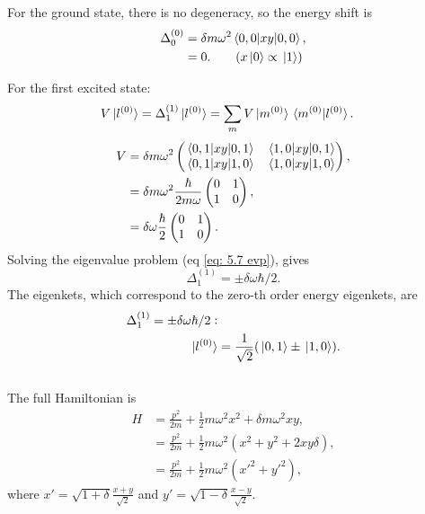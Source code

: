 \documentclass[
a4paper,
10pt,
twoside,
]{article}
\begin{document}
\subsection{}\label{ssec: IIb}

For the ground state, there is no degeneracy, so the energy shift is
\begin{align}
	\Delta_0^{(0)} &= \delta m \omega^2 \mel*{0,0}{xy}{0,0},\\
	&= 0. \qquad (x\ket*{0}\propto \ket*{1})
\end{align}

For the first excited state:
\begin{align}
	V\ket*{l^{(0)}} = \Delta_1^{(1)}\ket*{l^{(0)}} &= \sum_{m} V\ket*{m^{(0)}}\ip*{m^{(0)}}{l^{(0)}}.
	\label{eq: 5.7 evp}
\end{align}
\begin{align}
	V &= \delta m \omega^2\begin{pmatrix}
		\mel*{0,1}{xy}{0,1} & \mel*{1,0}{xy}{0,1}\\
		\mel*{0,1}{xy}{1,0} & \mel*{1,0}{xy}{1,0}
	\end{pmatrix},\\
	&= \delta m \omega^2 \frac{\hbar}{2m\omega}\begin{pmatrix}
		0 & 1\\
		1 & 0
	\end{pmatrix},\\
	&= \delta \omega \frac{\hbar}{2}\begin{pmatrix}
		0 & 1\\
		1 & 0
	\end{pmatrix}.
\end{align}
Solving the eigenvalue problem (eq \ref{eq: 5.7 evp}), gives
\begin{equation}
	\Delta_1^{(1)} = \pm\delta\omega\hbar/2.
\end{equation}
The eigenkets, which correspond to the zero-th order energy eigenkets, are
\begin{align}
	\Delta_1^{(1)} = \pm\delta\omega\hbar/2:& \nonumber\\
	\ket*{l^{(0)}} &= \frac{1}{\sqrt{2}} (\ket*{0,1}\pm\ket*{1,0}).
\end{align}

\subsection{}\label{subsec: IIc}

The full Hamiltonian is
\begin{align}
	H &= \frac{p^2}{2m} + \frac{1}{2}m\omega^2 x^2 + \delta m \omega^2 xy,\\
	&= \frac{p^2}{2m} + \frac{1}{2}m\omega^2 (x^2+y^2+2xy\delta),\\
	&= \frac{p^2}{2m} + \frac{1}{2}m\omega^2 (x'^2+y'^2),
\end{align}
where $x' = \sqrt{1+\delta}\frac{x+y}{\sqrt{2}}$ and $y' = \sqrt{1-\delta}\frac{x-y}{\sqrt{2}}$.
\end{document}
